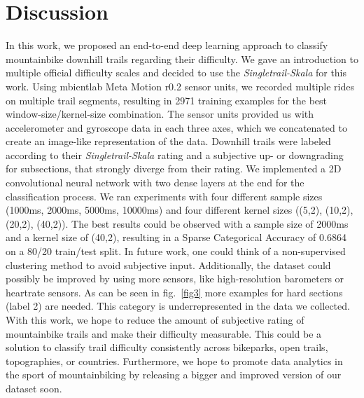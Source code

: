\documentclass[runningheads]{llncs}
\begin{document}
\section{Discussion}
In this work, we proposed an end-to-end deep learning approach to classify mountainbike downhill trails regarding their difficulty. 
We gave an introduction to multiple official difficulty scales and decided to use the \textit{Singletrail-Skala} for this work.
Using mbientlab Meta Motion r0.2 sensor units, we recorded multiple rides on multiple trail segments, resulting in 2971 training examples for the best window-size/kernel-size combination.
The sensor units provided us with accelerometer and gyroscope data in each three axes, which we concatenated to create an image-like representation of the data.
Downhill trails were labeled according to their \textit{Singletrail-Skala} rating and a subjective up- or downgrading for subsections, that strongly diverge from their rating.
We implemented a 2D convolutional neural network with two dense layers at the end for the classification process.
We ran experiments with four different sample sizes (1000ms, 2000ms, 5000ms, 10000ms) and four different kernel sizes ((5,2), (10,2), (20,2), (40,2)).
The best results could be observed with a sample size of 2000ms and a kernel size of (40,2), resulting in a Sparse Categorical Accuracy of 0.6864 on a 80/20 train/test split.
In future work, one could think of a non-supervised clustering method to avoid subjective input.
Additionally, the dataset could possibly be improved by using more sensors, like high-resolution barometers or heartrate sensors.
As can be seen in fig.~\ref{fig3} more examples for hard sections (label 2) are needed.
This category is underrepresented in the data we collected.
\\
With this work, we hope to reduce the amount of subjective rating of mountainbike trails and make their difficulty measurable.
This could be a solution to classify trail difficulty consistently across bikeparks, open trails, topographies, or countries.
Furthermore, we hope to promote data analytics in the sport of mountainbiking by releasing a bigger and improved version of our dataset soon.




\end{document}
